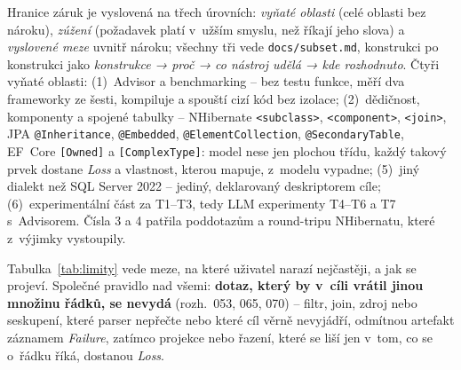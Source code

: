 \documentclass{article}
\begin{document}
Hranice záruk je vyslovená na třech úrovních: \emph{vyňaté oblasti} (celé oblasti bez nároku), \emph{zúžení} (požadavek platí v~užším smyslu, než říkají jeho slova) a \emph{vyslovené meze} uvnitř nároku; všechny tři vede \texttt{docs/subset.md}, konstrukci po konstrukci jako \emph{konstrukce → proč → co nástroj udělá → kde rozhodnuto}. Čtyři vyňaté oblasti: (1)~Advisor a benchmarking -- bez testu funkce, měří dva frameworky ze šesti, kompiluje a spouští cizí kód bez izolace; (2)~dědičnost, komponenty a spojené tabulky -- NHibernate \texttt{<subclass>}, \texttt{<component>}, \texttt{<join>}, JPA \texttt{@Inheritance}, \texttt{@Embedded}, \texttt{@ElementCollection}, \texttt{@SecondaryTable}, EF~Core \texttt{[Owned]} a \texttt{[ComplexType]}: model nese jen plochou třídu, každý takový prvek dostane \emph{Loss} a vlastnost, kterou mapuje, z~modelu vypadne; (5)~jiný dialekt než SQL Server 2022 -- jediný, deklarovaný deskriptorem cíle; (6)~experimentální část za T1--T3, tedy LLM experimenty T4--T6 a T7 s~Advisorem. Čísla 3 a 4 patřila poddotazům a round-tripu NHibernatu, které z~výjimky vystoupily.

Tabulka~\ref{tab:limity} vede meze, na které uživatel narazí nejčastěji, a jak se projeví. Společné pravidlo nad všemi: \textbf{dotaz, který by v~cíli vrátil jinou množinu řádků, se nevydá} (rozh.~053, 065, 070) -- filtr, join, zdroj nebo seskupení, které parser nepřečte nebo které cíl věrně nevyjádří, odmítnou artefakt záznamem \emph{Failure}, zatímco projekce nebo řazení, které se liší jen v~tom, co se o~řádku říká, dostanou \emph{Loss}.
\end{document}
